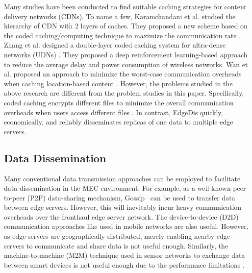 \documentclass[10pt,journal,compsoc]{IEEEtran}
\begin{document}
Many studies have been conducted to find suitable caching strategies for content delivery networks (CDNs). To name a few, Karamchandani et al. studied the hierarchy of CDN with 2 layers of caches. They proposed a new scheme based on the coded caching/computing technique to maximize the communication rate \cite{karamchandani2016hierarchical}.
Zhang et al. designed a double-layer coded caching system for ultra-dense networks (UDNs) \cite{zhang2019double}. They proposed a deep reinforcement learning-based approach to reduce the average delay and power consumption of wireless networks. Wan et al. proposed an approach to minimize the worst-case communication overheads when caching location-based content \cite{wan2022optimal}. However, the problems studied in the above research are different from the problem studies in this paper. Specifically, coded caching encrypts different files to minimize the overall communication overheads when users access different files \cite{cheng2021novel}. In contrast, EdgeDis quickly, economically, and reliably disseminates replicas of one data to multiple edge servers.


\vspace{-1em}
\subsection{Data Dissemination}

Many conventional data transmission approaches can be employed to facilitate data dissemination in the MEC environment. For example, as a well-known peer-to-peer (P2P) data-sharing mechanism, Gossip~\cite{boyd2006randomized} can be used to transfer data between edge servers. However, this will inevitably incur heavy communication overheads over the fronthaul edge server network. The device-to-device (D2D) communication approaches like \cite{feng2014device} used in mobile networks are also useful. However, as edge servers are geographically distributed, merely enabling nearby edge servers to communicate and share data is not useful enough. Similarly, the machine-to-machine (M2M) technique used in sensor networks to exchange data between smart devices is not useful enough due to the performance limitations \cite{verma2016machine}.
\end{document}
